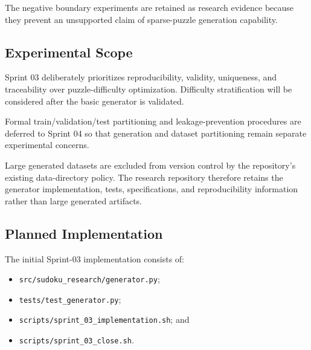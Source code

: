 \documentclass[11pt,a4paper]{article}
\begin{document}
The negative boundary experiments are retained as research evidence because
they prevent an unsupported claim of sparse-puzzle generation capability.

\subsection{Experimental Scope}

Sprint 03 deliberately prioritizes reproducibility, validity, uniqueness,
and traceability over puzzle-difficulty optimization. Difficulty
stratification will be considered after the basic generator is validated.

Formal train/validation/test partitioning and leakage-prevention procedures
are deferred to Sprint 04 so that generation and dataset partitioning remain
separate experimental concerns.

Large generated datasets are excluded from version control by the
repository's existing data-directory policy. The research repository
therefore retains the generator implementation, tests, specifications, and
reproducibility information rather than large generated artifacts.

\subsection{Planned Implementation}

The initial Sprint-03 implementation consists of:

\begin{itemize}
    \item \texttt{src/sudoku\_research/generator.py};
    \item \texttt{tests/test\_generator.py};
    \item \texttt{scripts/sprint\_03\_implementation.sh}; and
    \item \texttt{scripts/sprint\_03\_close.sh}.
\end{itemize}
\end{document}
